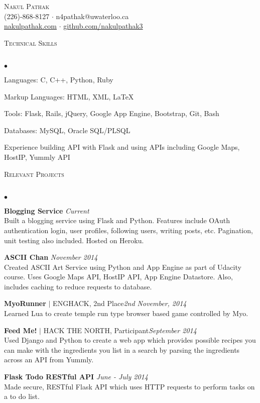 \documentclass{article}
\newcommand{\lineunder}{\vspace*{-8pt} \\ \hspace*{-18pt} \hrulefill \\}
\newcommand{\header}[1]{{\hspace*{-15pt}\vspace*{6pt} \textsc{#1}} \vspace*{-6pt} \lineunder}
\newenvironment{achievements}{\begin{list}{$\bullet$}{\topsep 0pt \itemsep -1.5pt \leftmargin 5pt}}{\vspace*{4pt}\end{list}}
\begin{document}
\small
\smallskip
\vspace*{-45pt}

\begin{center}
	{\huge \scshape {Nakul Pathak}} \\
\vspace*{6pt} 
(226)-868-8127 $\cdot$ n4pathak@uwaterloo.ca \\
\vspace{1.5pt}
  \url{nakulpathak.com}  $\cdot$ \url{github.com/nakulpathak3}
\end{center}


\vspace{-10pt}
\header{\normalsize Technical Skills}
\begin{achievements}
\item Languages: C, C++, Python, Ruby
\item Markup Languages: HTML, XML, LaTeX
\item Tools: Flask, Rails, jQuery, Google App Engine, Bootstrap, Git, Bash
\item Databases: MySQL, Oracle SQL/PLSQL
\item Experience building API with Flask and using APIs including Google Maps, HostIP, Yummly API
\end{achievements}

\vspace{7pt}

\header{\normalsize Relevant Projects}
\begin{achievements}
\item \textbf{Blogging Service}  \hfill \textit {Current}
\\ Built a blogging service using Flask and Python. Features include OAuth authentication login, user profiles, following users, writing posts, etc. Pagination, unit testing also included. Hosted on Heroku.
\item \textbf{ASCII Chan} \hfill \textit {November 2014}
\\ Created ASCII Art Service using Python and App Engine as part of Udacity course. Uses Google Maps API, HostIP API, App Engine Datastore. Also, includes caching to reduce requests to database. 
\item\textbf{MyoRunner} {$|$ \scriptsize ENGHACK, 2nd Place}\hfill\textit{2nd November, 2014}
\\ Learned Lua to create temple run type browser based game controlled by Myo.
\item \textbf{Feed Me!} {$|$ \scriptsize HACK THE NORTH, Participant}\hfill \textit {September 2014}
\\ Used Django and Python to create a web app which provides possible recipes you can make with the ingredients you list in a search by parsing the ingredients across an API from Yummly.
\item \textbf{Flask Todo RESTful API} \hfill \textit {June - July 2014}
\\ Made secure, RESTful Flask API which uses HTTP requests to perform tasks on a to do list.
\end{achievements}
\end{document}
